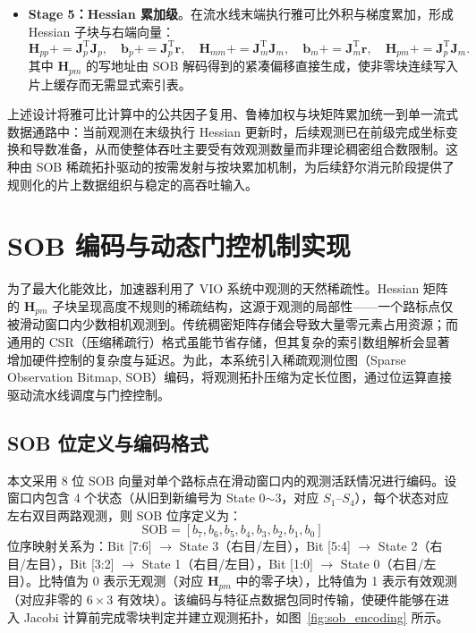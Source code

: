 \begin{itemize}
\begin{equation}
    \end{equation}
    \item \textbf{Stage 5：Hessian 累加级}。在流水线末端执行雅可比外积与梯度累加，形成 Hessian 子块与右端向量：
    \begin{equation}
        \mathbf{H}_{pp}{+}=\mathbf{J}_p^{\mathrm{T}}\mathbf{J}_p,\quad
        \mathbf{b}_p{+}=\mathbf{J}_p^{\mathrm{T}}\mathbf{r},\quad
        \mathbf{H}_{mm}{+}=\mathbf{J}_m^{\mathrm{T}}\mathbf{J}_m,\quad
        \mathbf{b}_m{+}=\mathbf{J}_m^{\mathrm{T}}\mathbf{r},\quad
        \mathbf{H}_{pm}{+}=\mathbf{J}_p^{\mathrm{T}}\mathbf{J}_m.
    \end{equation}
    其中 $\mathbf{H}_{pm}$ 的写地址由 SOB 解码得到的紧凑偏移直接生成，使非零块连续写入片上缓存而无需显式索引表。
\end{itemize}

上述设计将雅可比计算中的公共因子复用、鲁棒加权与块矩阵累加统一到单一流式数据通路中：当前观测在末级执行 Hessian 更新时，后续观测已在前级完成坐标变换和导数准备，从而使整体吞吐主要受有效观测数量而非理论稠密组合数限制。这种由 SOB 稀疏拓扑驱动的按需发射与按块累加机制，为后续舒尔消元阶段提供了规则化的片上数据组织与稳定的高吞吐输入。

\section{SOB 编码与动态门控机制实现}

为了最大化能效比，加速器利用了 VIO 系统中观测的天然稀疏性。Hessian 矩阵的 $\mathbf{H}_{pm}$ 子块呈现高度不规则的稀疏结构，这源于观测的局部性——一个路标点仅被滑动窗口内少数相机观测到。传统稠密矩阵存储会导致大量零元素占用资源；而通用的 CSR（压缩稀疏行）格式虽能节省存储，但其复杂的索引数组解析会显著增加硬件控制的复杂度与延迟。为此，本系统引入稀疏观测位图（Sparse Observation Bitmap, SOB）编码，将观测拓扑压缩为定长位图，通过位运算直接驱动流水线调度与门控控制。

\subsection{SOB 位定义与编码格式}

本文采用 8 位 SOB 向量对单个路标点在滑动窗口内的观测活跃情况进行编码。设窗口内包含 4 个状态（从旧到新编号为 State 0$\sim$3，对应 $S_1$--$S_4$），每个状态对应左右双目两路观测，则 SOB 位序定义为：
\begin{equation}
    \text{SOB} = [b_7,b_6,b_5,b_4,b_3,b_2,b_1,b_0]
\end{equation}
位序映射关系为：Bit [7:6] $\rightarrow$ State 3（右目/左目），Bit [5:4] $\rightarrow$ State 2（右目/左目），Bit [3:2] $\rightarrow$ State 1（右目/左目），Bit [1:0] $\rightarrow$ State 0（右目/左目）。比特值为 0 表示无观测（对应 $\mathbf{H}_{pm}$ 中的零子块），比特值为 1 表示有效观测（对应非零的 $6\times3$ 有效块）。该编码与特征点数据包同时传输，使硬件能够在进入 Jacobi 计算前完成零块判定并建立观测拓扑，如图~\ref{fig:sob_encoding} 所示。

